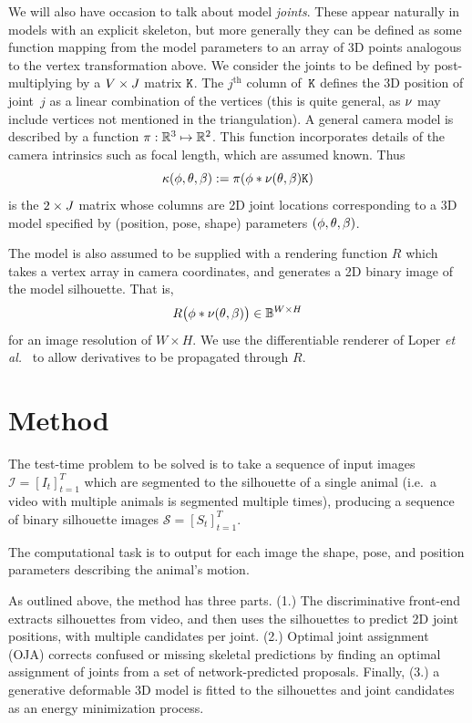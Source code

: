   \def\proj{\pi}
  We will also have occasion to talk about model {\em joints}.  These appear naturally in models with an explicit skeleton, but more generally they can be defined as some function mapping from the model parameters to an array of 3D points analogous to the vertex transformation above.  We consider the joints to be defined by post-multiplying by a $V \times J$ matrix $\mathtt{K}$.  The $j^{\text{th}}$ column of~$\mathtt{K}$ defines the 3D position of joint~$j$ as a linear combination of the vertices (this is quite general, as $\nu$ may include vertices not mentioned in the triangulation).  A general camera model is described by a function $\proj: \R 3 \mapsto \R 2$.  This function incorporates details of the camera intrinsics such as focal length, which are assumed known.  
  Thus 
  \begin{equation}
  \kappa(\posn, \pose, \shape) := \proj(\posn * \verts(\pose, \shape) \jointselect)
  \end{equation}
  is the $2\times J$ matrix whose columns are 2D joint locations corresponding to a 3D model specified by (position, pose, shape) parameters $(\phi, \theta, \beta)$.
  
  The model is also assumed to be supplied with a rendering function $R$ which takes a vertex array in camera coordinates, and generates a 2D binary image of the model silhouette.  That is,
  \begin{equation}
  R\bigl(\phi * \nu(\theta, \beta)\bigr) \in \mathbb{B}^{W\times H}
  \end{equation}
  for an image resolution of $W \times H$.  We use the differentiable renderer of Loper {\em et al.}~\cite{loper2014opendr} to allow derivatives to be propagated through $R$.  
  \newpage
  \section{Method}
  \def\seq#1#2#3#4{\left[{#1_{#2}}\right]_{#2=#3}^{#4}}
  The test-time problem to be solved is to take a sequence of input images
  $
  \mathcal I = \seq I t1T
  $
  which are segmented to the silhouette of a single animal (i.e.~a video with multiple animals is segmented multiple times), producing a sequence of binary silhouette images 
  $
  \mathcal S = \seq S t1T.
  $
  
  The computational task is to output for each image the shape,  pose, and position parameters describing the animal's motion.
  
  As outlined above, the method has three parts.  
  (1.) The discriminative front-end extracts silhouettes from video, and then uses the silhouettes to predict 2D joint positions, with multiple candidates per joint. 
  (2.) Optimal joint assignment (OJA) corrects confused or missing skeletal predictions by finding an optimal assignment of joints from a set of network-predicted proposals. Finally, (3.) a generative deformable 3D model is fitted to the silhouettes and joint candidates as an energy minimization process.
  

